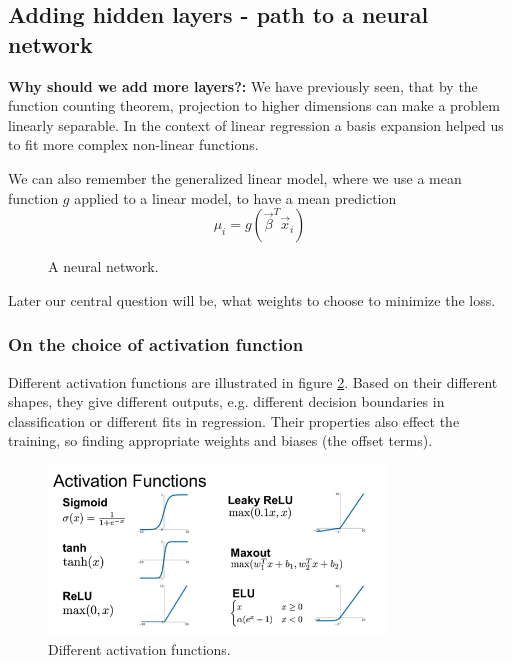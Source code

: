 \subsection{Adding hidden layers - path to a neural network}
\textbf{Why should we add more layers?:} We have previously seen, 
that by the function counting theorem,
projection to higher dimensions can make a problem linearly separable.
In the context of linear regression a basis expansion helped us to fit
more complex non-linear functions.

We can also remember the generalized linear model, where we use a 
mean function $g$ applied to a linear model, to have a mean prediction
\begin{equation}
    \mu_i = g(\vec{\beta}^T \vec{x}_i)
\end{equation}


\begin{figure}[!htb]
    \centering
    
    \caption{A neural network.}
    \label{fig:nn_illu}
\end{figure}

Later our central question will be, what weights to choose to minimize the loss.

\subsubsection{On the choice of activation function}
Different activation functions are illustrated in figure \ref{fig:activation_functions}.
Based on their different shapes, they give different outputs, e.g. different
decision boundaries in classification or different fits in regression. Their properties
also effect the training, so finding appropriate weights and biases (the offset terms).

\begin{figure}[!htb]
    \centering
    \includegraphics[width=0.8\textwidth]{figures/activation_functions.png}
    \caption{Different activation functions.}
    \label{fig:activation_functions}
\end{figure}

